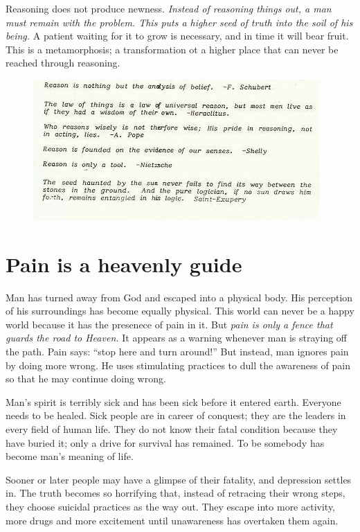 \documentclass[12pt,letterpaper]{article}
\begin{document}
Reasoning does not produce newness. \emph{Instead of reasoning things
out, a man must remain with the problem. This puts a higher seed of
truth into the soil of his being.} A patient waiting for it to grow is
necessary, and in time it will bear fruit. This is a metamorphosis; a
transformation ot a higher place that can never be reached through
reasoning.

\begin{figure} \centering
  \includegraphics[width=\textwidth,bb=0 0 414 203]{p23quotes.jpg}
\end{figure}


\section{Pain is a heavenly guide}

Man has turned away from God and escaped into a physical body. His
perception of his surroundings has become equally physical. This world
can never be a happy world because it has the presenece of pain in
it. But \emph{pain is only a fence that guards the road to Heaven.} It
appears as a warning whenever man is straying off the path. Pain says:
``stop here and turn around!'' But instead, man ignores pain by doing
more wrong. He uses stimulating practices to dull the awareness of
pain so that he may continue doing wrong.

Man's spirit is terribly sick and has been sick before it entered
earth. Everyone needs to be healed. Sick people are in career of
conquest; they are the leaders in every field of human life. They do
not know their fatal condition because they have buried it; only a
drive for survival has remained. To be somebody has become man's
meaning of life.

Sooner or later people may have a glimpse of their fatality, and
depression settles in. The truth becomes so horrifying that, instead
of retracing their wrong steps, they choose suicidal practices as the
way out. They escape into more activity, more drugs and more
excitement until unawareness has overtaken them again.
\end{document}
